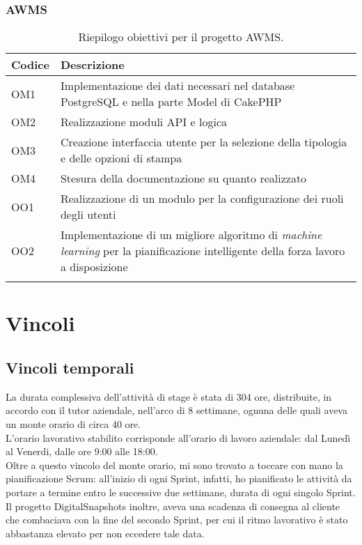 \subsubsection*{AWMS}
\begin{center}
	\renewcommand{\arraystretch}{1.5}
	\begin{longtable}{ | p{0.1\linewidth} | p{0.9\linewidth} |}	 
		\hline   
	    \rowcolor{header}\textbf{Codice}&\textbf{Descrizione}\\
		\hline   	
    	OM1 & Implementazione dei dati necessari nel database PostgreSQL e nella parte Model di CakePHP \\
    	OM2 & Realizzazione moduli API e logica \\
    	OM3 & Creazione interfaccia utente per la selezione della tipologia e delle opzioni di stampa \\
    	OM4 & Stesura della documentazione su quanto realizzato \\
    	OO1 & Realizzazione di un modulo per la configurazione dei ruoli degli utenti \\
    	OO2 & Implementazione di un migliore algoritmo di \textit{machine learning} per la pianificazione intelligente della forza lavoro a disposizione \\
    	\hline
    	\rowcolor{white}
    	\caption{Riepilogo obiettivi per il progetto AWMS.}
	\end{longtable}
	\label{tab:obiettivi-AWMS}
\end{center}

\section{Vincoli}
\subsection{Vincoli temporali}

La durata complessiva dell'attività di stage è stata di 304 ore, distribuite, in accordo con il tutor aziendale, nell'arco di 8 settimane, ognuna delle quali aveva un monte orario di circa 40 ore. \\
L'orario lavorativo stabilito corrisponde all'orario di lavoro aziendale: dal Lunedì al Venerdi, dalle ore 9:00 alle 18:00.\\
Oltre a questo vincolo del monte orario, mi sono trovato a toccare con mano la pianificazione Scrum: all'inizio di ogni Sprint, infatti, ho pianificato le attività da portare a termine entro le successive due settimane, durata di ogni singolo Sprint.\\
Il progetto DigitalSnapshots inoltre, aveva una scadenza di consegna al cliente che combaciava con la fine del secondo Sprint, per cui il ritmo lavorativo è stato abbastanza elevato per non eccedere tale data.

